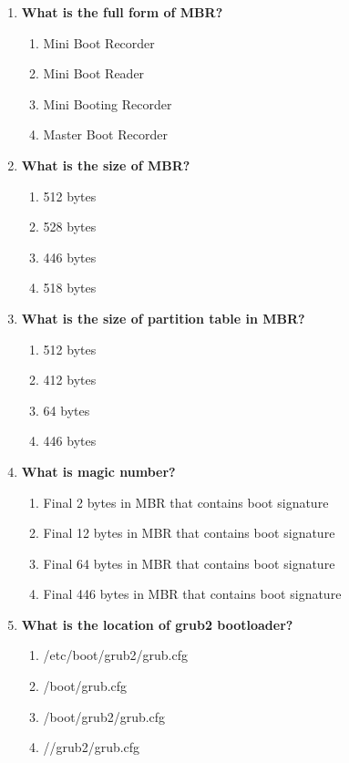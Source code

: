 \begin{flushleft}
\begin{enumerate}
		\item \textbf{What is the full form of MBR?}
		\begin{enumerate}[label=(\alph*)]
			\item Mini Boot Recorder
			\item Mini Boot Reader
			\item Mini Booting Recorder   
			\item Master Boot Recorder    %
		\end{enumerate}
		\bigskip
		\bigskip	
		
		\item \textbf{What is the size of MBR?}
		\begin{enumerate}[label=(\alph*)]
			\item 512 bytes   %
			\item 528 bytes  
			\item 446 bytes 
			\item 518 bytes   
		\end{enumerate}
		\bigskip
		\bigskip	

		\item \textbf{What is the size of partition table in MBR?}
		\begin{enumerate}[label=(\alph*)]
			\item 512 bytes
			\item 412 bytes   
			\item 64 bytes     %
			\item 446 bytes   
		\end{enumerate}
		\bigskip
		\bigskip	

		\item \textbf{What is magic number?}
		\begin{enumerate}[label=(\alph*)]
			\item Final 2 bytes in MBR that contains boot signature    
			\item Final 12 bytes in MBR that contains boot signature    
			\item Final 64 bytes in MBR that contains boot signature    
			\item Final 446 bytes in MBR that contains boot signature    %
		\end{enumerate}
		\bigskip
		\bigskip	

		\item \textbf{What is the location of grub2 bootloader?}
		\begin{enumerate}[label=(\alph*)]
			\item /etc/boot/grub2/grub.cfg
			\item /boot/grub.cfg
			\item /boot/grub2/grub.cfg  %
			\item //grub2/grub.cfg
		\end{enumerate}
		\bigskip
		\bigskip


\end{enumerate}
\end{flushleft}
